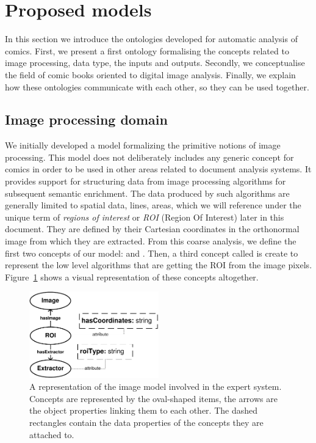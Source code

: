 \section{Proposed models} %
\label{sec:kn:proposed_models}

In this section we introduce the ontologies developed for automatic analysis of comics.
First, we present a first ontology formalising the concepts related to image processing, data type, the inputs and outputs.
Secondly, we conceptualise the field of comic books oriented to digital image analysis.
Finally, we explain how these ontologies communicate with each other, so they can be used together.

\subsection{Image processing domain} %
\label{sub:kn:image_processing_domain}

We initially developed a model formalizing the primitive notions of image processing.
This model does not deliberately includes any generic concept for comics in order to be used in other areas related to document analysis systems.
It provides support for structuring data from image processing algorithms for subsequent semantic enrichment.
The data produced by such algorithms are generally limited to spatial data, lines, areas, which we will reference under the unique term of \textit{regions of interest} or \textit{ROI} (Region Of Interest) later in this document.
They are defined by their Cartesian coordinates in the orthonormal image from which they are extracted.
From this coarse analysis, we define the first two concepts of our model:  and .
Then, a third concept called  is create to represent the low level algorithms that are getting the ROI from the image pixels.
Figure~\ref{fig:kn:model_image} shows a visual representation of these concepts altogether.

 \begin{figure}[!ht]
   \centering
  \includegraphics[width=0.5\textwidth]{model_image.pdf}
  \caption[A representation of the image model involved in the expert system]{A representation of the image model involved in the expert system. Concepts are represented by the oval-shaped items, the arrows are the object properties linking them to each other. The dashed rectangles contain the data properties of the concepts they are attached to.}
  \label{fig:kn:model_image}
 \end{figure}


